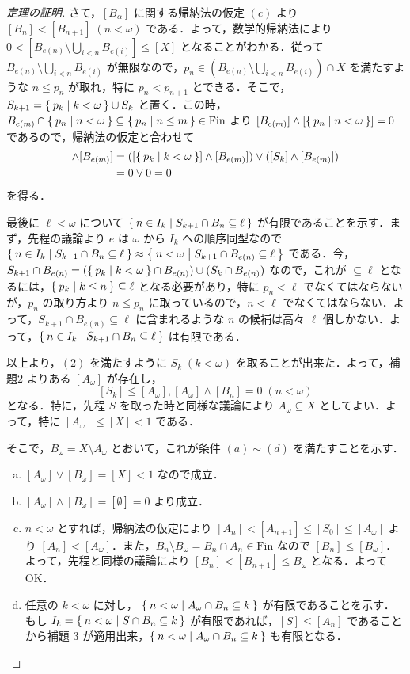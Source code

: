 \documentclass[a4j]{jsarticle}
\newcommand{\Fin}{\mathrm{Fin}}
\begin{document}
\begin{proof}[定理の証明]
 さて，$[B_\alpha]$ に関する帰納法の仮定 $(c)$ より $[B_n] < [B_{n+1}] \; (n < \omega)$ である．よって，数学的帰納法により $0 < [B_{e(n)} \setminus \bigcup_{i < n} B_{e(i)}] \leq [X]$ となることがわかる．従って $B_{e(n)} \setminus \bigcup_{i < n} B_{e(i)}$ が無限なので，$p_n \in (B_{e(n)} \setminus \bigcup_{i<n} B_{e(i)}) \cap X$ を満たすような $n \leq p_n$ が取れ，特に $p_n < p_{n+1}$ とできる．そこで，$S_{k+1} = \Set{p_k | k < \omega} \cup S_k$ と置く．この時，$B_{e(m)} \cap \Set{ p_n | n < \omega} \subseteq \Set{ p_n | n \leq m } \in \Fin$ より $[B_{e(m)}] \wedge [\Set{ p_n | n < \omega}] = 0$ であるので，帰納法の仮定と合わせて
 \begin{align*}
  [S_{k+1}] \wedge [B_{e(m)}] &= ([\Set{p_k | k < \omega}] \wedge [B_{e(m)}]) \vee ([S_k] \wedge [B_{e(m)}])\\
  &= 0 \vee 0 = 0 
 \end{align*}
 を得る．

 最後に $\ell < \omega$ について $\Set{n \in I_k | S_{k+1} \cap B_n \subseteq \ell}$ が有限であることを示す．まず，先程の議論より $e$ は $\omega$ から $I_k$ への順序同型なので $\Set{ n \in I_k | S_{k+1} \cap B_n \subseteq \ell} \approx \Set{ n < \omega | S_{k+1} \cap B_{e(n)} \subseteq \ell}$ である．今，$S_{k+1} \cap B_{e(n)} = (\Set{p_k | k < \omega} \cap B_{e(n)}) \cup (S_k \cap B_{e(n)})$ なので，これが $\subseteq \ell$ となるには，$\Set{p_k | k \leq n} \subseteq \ell$ となる必要があり，特に $p_n < \ell$ でなくてはならないが，$p_n$ の取り方より $n \leq p_n$ に取っているので，$n < \ell$ でなくてはならない．よって，$S_{k+1} \cap B_{e(n)} \subseteq \ell$ に含まれるような $n$ の候補は高々 $\ell$ 個しかない．よって，$\Set{ n \in I_k | S_{k+1} \cap B_n \subseteq \ell}$ は有限である．

 以上より，$(2)$ を満たすように $S_k \; (k < \omega)$ を取ることが出来た．よって，補題$2$ よりある $[A_\omega]$ が存在し，
 \[
  [S_k] \leq [A_\omega], [A_\omega] \wedge [B_n] = 0 \; (n < \omega)
 \]
 となる．特に，先程 $S$ を取った時と同様な議論により $A_\omega \subseteq X$ としてよい．よって，特に $[A_\omega] \leq [X] < 1 $ である．

 そこで，$B_\omega = X \setminus A_\omega$ とおいて，これが条件 $(a) \sim (d)$ を満たすことを示す．

 \begin{enumerate}[(a)]
  \item $[A_\omega] \vee [B_\omega] = [X] < 1$ なので成立．
  \item $[A_\omega] \wedge [B_\omega] = [\emptyset] = 0$ より成立．
  \item $n < \omega$ とすれば，帰納法の仮定により $[A_n] < [A_{n+1}] \leq [S_0] \leq [A_\omega]$ より $[A_n] < [A_\omega]$．また，$B_n \setminus B_\omega = B_n \cap A_n \in \Fin$ なので $[B_n] \leq [B_\omega]$．よって，先程と同様の議論により $[B_n] < [B_{n+1}] \leq B_\omega$ となる．よって OK．
  \item 任意の $k < \omega$ に対し， $\Set{n < \omega | A_\omega \cap B_n \subseteq k}$ が有限であることを示す．もし $I_k = \Set{ n < \omega | S \cap B_n \subseteq k}$ が有限であれば，$[S] \leq [A_n]$ であることから補題 $3$ が適用出来，$\Set{ n < \omega | A_\omega \cap B_n \subseteq k }$ も有限となる．


\end{enumerate}
\end{proof}
\end{document}
